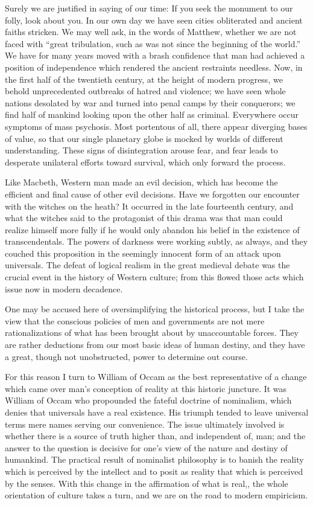 \begin{quotationx}
Surely we are justified in saying of our time: If you seek the monument to our folly, look about you. In our own day we have seen cities obliterated and ancient faiths stricken. We may well ask, in the words of Matthew, whether we are not faced with ``great tribulation, such as was not since the beginning of the world.'' We have for many years moved with a brash confidence that man had achieved a position of independence which rendered the ancient restraints needless. Now, in the first half of the twentieth century, at the height of modern progress, we behold unprecedented outbreaks of hatred and violence; we have seen whole nations desolated by war and turned into penal camps by their conquerors; we find half of mankind looking upon the other half as criminal. Everywhere occur symptoms of mass psychosis. Most portentous of all, there appear diverging bases of value, so that our single planetary globe is mocked by worlds of different understanding. These signs of disintegration arouse fear, and fear leads to desperate unilateral efforts toward survival, which only forward the process.

Like Macbeth, Western man made an evil decision, which has become the efficient and final cause of other evil decisions. Have we forgotten our encounter with the witches on the heath? It occurred in the late fourteenth century, and what the witches said to the protagonist of this drama was that man could realize himself more fully if he would only abandon his belief in the existence of transcendentals. The powers of darkness were working subtly, as always, and they couched this proposition in the seemingly innocent form of an attack upon universals. The defeat of logical realism in the great medieval debate was the crucial event in the history of Western culture; from this flowed those acts which issue now in modern decadence.

One may be accused here of oversimplifying the historical process, but I take the view that the conscious policies of men and governments are not mere rationalizations of what has been brought about by unaccountable forces. They are rather deductions from our most basic ideas of human destiny, and they have a great, though not unobstructed, power to determine out course.

For this reason I turn to William of Occam as the best representative of a change which came over man's conception of reality at this historic juncture. It was William of Occam who propounded the fateful doctrine of nominalism, which denies that universals have a real existence. His triumph tended to leave universal terms mere names serving our convenience. The issue ultimately involved is whether there is a source of truth higher than, and independent of, man; and the answer to the question is decisive for one's view of the nature and destiny of humankind. The practical result of nominalist philosophy is to banish the reality which is perceived by the intellect and to posit as reality that which is perceived by the senses. With this change in the affirmation of what is real,, the whole orientation of culture takes a turn, and we are on the road to modern empiricism.
\end{quotationx}

